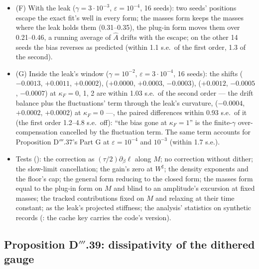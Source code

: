 \begin{itemize}
    with the correction, 8.06 without (a saturated amplitude holds no fit energy), the dither's level read back to
    0.4\%.
  \item (F) With the leak ($\gamma = 3\cdot10^{-3}$, $\varepsilon = 10^{-4}$, 16 seeds): two seeds' positions escape
    the exact fit's well in every form; the masses form keeps the masses where the leak holds them (0.31--0.35), the
    plug-in form moves them over 0.21--0.46, a running average of $\hat A$ drifts with the escape; on the other 14
    seeds the bias reverses as predicted (within 1.1 s.e.\ of the first order, 1.3 of the second).
  \item (G) Inside the leak's window ($\gamma = 10^{-2}$, $\varepsilon = 3\cdot10^{-4}$, 16 seeds): the shifts
    ($-0.0013$, $+0.0011$, $+0.0002$), ($+0.0000$, $+0.0003$, $-0.0003$), ($+0.0012$, $-0.0005$, $-0.0007$) at
    $\kappa_F = 0$, 1, 2 are within 1.03 s.e.\ of the second order --- the drift balance plus the fluctuations' term
    through the leak's curvature, ($-0.0004$, $+0.0002$, $+0.0002$) at $\kappa_F = 0$ ---, the paired differences
    within 0.93 s.e.\ of it
    (the first order 1.2--4.8 s.e.\ off): ``the bias gone at $\kappa_F = 1$'' is the finite-$\gamma$
    over-compensation cancelled by the fluctuation term. The same term accounts for Proposition D$'''$.37's Part G at
    $\varepsilon = 10^{-4}$ and $10^{-3}$ (within 1.7 s.e.).
  \item Tests (): the correction as $(\tau/2)\partial_\beta\ell$ along $M$; no
    correction without dither; the slow-limit cancellation; the gain's zero at $W^\sharp$; the density exponents and
    the floor's cap; the general form reducing to the closed form; the masses form equal to the plug-in form on $M$
    and blind to an amplitude's excursion at fixed masses; the tracked contributions fixed on $M$ and relaxing at
    their time constant;  as the leak's projected stiffness; the analysis' statistics on synthetic
    records (: the cache key carries the code's version).
\end{itemize}

\subsection{Proposition D\texorpdfstring{$'''$}{'''}.39: dissipativity of the dithered gauge}

